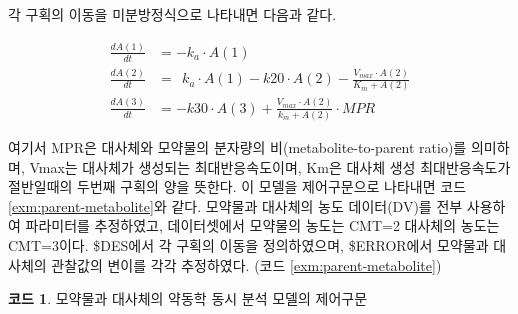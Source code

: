 \documentclass[
  10pt,
  krantz2,
  a4paper]{krantz}
\theoremstyle{definition}
\theoremstyle{definition}
\newtheorem{example}{코드}[chapter]
\theoremstyle{definition}
\theoremstyle{remark}
\begin{document}
각 구획의 이동을 미분방정식으로 나타내면 다음과 같다.

\begin{equation} 
\begin{split}
  \frac{dA(1)}{dt} & = -k_a \cdot A(1)  \\
  \frac{dA(2)}{dt} & = \ \ k_a \cdot A(1) - k20 \cdot A(2) - \frac{V_{max} \cdot A(2)}{K_m + A(2)} \\
  \frac{dA(3)}{dt} & = -k30 \cdot A(3) + \frac{V_{max} \cdot A(2)}{k_m + A(2)} \cdot MPR
\end{split}
\label{eq:comp-mpr}
\end{equation}

여기서 MPR은 대사체와 모약물의 분자량의 비(metabolite-to-parent ratio)를 의미하며, Vmax는 대사체가 생성되는 최대반응속도이며, Km은 대사체 생성 최대반응속도가 절반일때의 두번째 구획의 양을 뜻한다. 이 모델을 제어구문으로 나타내면 코드 \ref{exm:parent-metabolite}와 같다. 모약물과 대사체의 농도 데이터(DV)를 전부 사용하여 파라미터를 추정하였고, 데이터셋에서 모약물의 농도는 CMT=2 대사체의 농도는 CMT=3이다. \$DES에서 각 구획의 이동을 정의하였으며, \$ERROR에서 모약물과 대사체의 관찰값의 변이를 각각 추정하였다. (코드 \ref{exm:parent-metabolite})

\begin{example}
\protect\hypertarget{exm:parent-metabolite}{}{\label{exm:parent-metabolite} }모약물과 대사체의 약동학 동시 분석 모델의 제어구문
\end{example}
\end{document}

